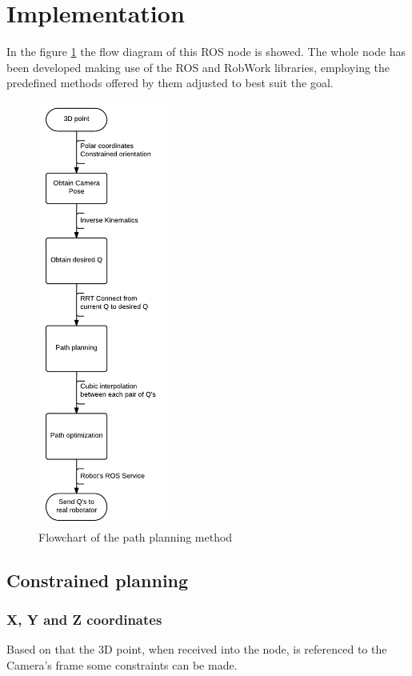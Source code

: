 \section{Implementation} %
\label{sec:implementation_pathplanning}
In the figure \ref{fig:path_planning_flowchart} the flow diagram of this ROS node is showed. The whole node has been developed making use of the ROS and RobWork libraries, employing the predefined methods offered by them adjusted to best suit the goal.
\begin{figure}[!hb]
	\centering
	\includegraphics[height=14cm]{figures/path_planning_flowchart}
	\caption{Flowchart of the path planning method}
	\label{fig:path_planning_flowchart}
\end{figure}

	\subsection{Constrained planning} %
	\label{sub:contrained_planning_implementation}
	\subsubsection{X, Y and Z coordinates} %
	\label{subsub:x_y_and_z_coordinates}
	Based on that the 3D point, when received into the node, is referenced to the Camera's frame some constraints can be made.\\
	
